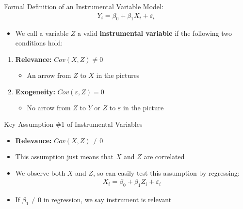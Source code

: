 \documentclass[aspectratio=169,11pt]{beamer}
\begin{document}
\begin{frame}{Formal Definition of an Instrumental Variable}
Model:
\begin{align*}
	Y_i = \beta_0 + \beta_1 X_i + \varepsilon_i
\end{align*}

\begin{itemize}
\item We call a variable $Z$ a valid {\bf instrumental variable} if the following two conditions hold:
\end{itemize}
\begin{enumerate}
	\item {\bf Relevance:} $Cov(X,Z)\ne 0$
		\begin{itemize}
			\item An arrow from $Z$ to $X$ in the pictures
		\end{itemize}
\medskip
	\item {\bf Exogeneity:} $Cov(\varepsilon,Z)= 0$
		\begin{itemize}
			\item No arrow from $Z$ to $Y$ or $Z$ to $\varepsilon$ in the picture
		\end{itemize}
\end{enumerate}
\end{frame}

\begin{frame}{Key Assumption \#1 of Instrumental Variables}
\begin{itemize}
	\item {\bf Relevance:} $Cov(X,Z)\ne 0$
\medskip
\item This assumption just means that $X$ and $Z$ are correlated
\medskip
\item We observe both $X$ and $Z$, so can easily test this assumption by regressing:
	\begin{align*}
	X_i = \beta_0 + \beta_1 Z_i + \varepsilon_i
	\end{align*}
\item If $\beta_1 \neq 0$ in regression, we say instrument is relevant
\end{itemize}
\end{frame}
\end{document}
